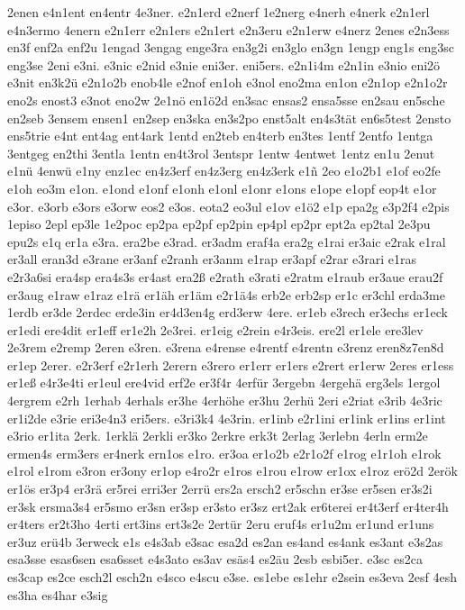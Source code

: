 {2enen
e4n1ent
en4entr
4e3ner.
e2n1erd
e2nerf
1e2nerg
e4nerh
e4nerk
e2n1erl
e4n3ermo
4enern
e2n1err
e2n1ers
e2n1ert
e2n3eru
e2n1erw
e4nerz
2enes
e2n3ess
en3f
enf2a
enf2u
1engad
3engag
enge3ra
en3g2i
en3glo
en3gn
1engp
eng1s
eng3sc
eng3se
2eni
e3ni.
e3nic
e2nid
e3nie
eni3er.
eni5ers.
e2n1i4m
e2n1in
e3nio
eni2ö
e3nit
en3k2ü
e2n1o2b
enob4le
e2nof
en1oh
e3nol
eno2ma
en1on
e2n1op
e2n1o2r
eno2s
enost3
e3not
eno2w
2e1nö
en1ö2d
en3sac
ensas2
ensa5sse
en2sau
en5sche
en2seb
3ensem
ensen1
en2sep
en3ska
en3s2po
enst5alt
en4s3tät
en6s5test
2ensto
ens5trie
e4nt
ent4ag
ent4ark
1entd
en2teb
en4terb
en3tes
1entf
2entfo
1entga
3entgeg
en2thi
3entla
1entn
en4t3rol
3entspr
1entw
4entwet
1entz
en1u
2enut
e1nü
4enwü
e1ny
enz1ec
en4z3erf
en4z3erg
en4z3erk
e1ñ
2eo
e1o2b1
e1of
eo2fe
e1oh
eo3m
e1on.
e1ond
e1onf
e1onh
e1onl
e1onr
e1ons
e1ope
e1opf
eop4t
e1or
e3or.
e3orb
e3ors
e3orw
eos2
e3os.
eota2
eo3ul
e1ov
e1ö2
e1p
epa2g
e3p2f4
e2pis
1episo
2epl
ep3le
1e2poc
ep2pa
ep2pf
ep2pin
ep4pl
ep2pr
ept2a
ep2tal
2e3pu
epu2s
e1q
er1a
e3ra.
era2be
e3rad.
er3adm
eraf4a
era2g
e1rai
er3aic
e2rak
e1ral
er3all
eran3d
e3rane
er3anf
e2ranh
er3anm
e1rap
er3apf
e2rar
e3rari
e1ras
e2r3a6si
era4sp
era4s3s
er4ast
era2ß
e2rath
e3rati
e2ratm
e1raub
er3aue
erau2f
er3aug
e1raw
e1raz
e1rä
er1äh
er1äm
e2r1ä4s
erb2e
erb2sp
er1c
er3chl
erda3me
1erdb
er3de
2erdec
erde3in
er4d3en4g
erd3erw
4ere.
er1eb
e3rech
er3echs
er1eck
er1edi
ere4dit
er1eff
er1e2h
2e3rei.
er1eig
e2rein
e4r3eis.
ere2l
er1ele
ere3lev
2e3rem
e2remp
2eren
e3ren.
e3rena
e4rense
e4rentf
e4rentn
e3renz
eren8z7en8d
er1ep
2erer.
e2r3erf
e2r1erh
2erern
e3rero
er1err
er1ers
e2rert
er1erw
2eres
er1ess
er1eß
e4r3e4ti
er1eul
ere4vid
erf2e
er3f4r
4erfür
3ergebn
4ergehä
erg3els
1ergol
4ergrem
e2rh
1erhab
4erhals
er3he
4erhöhe
er3hu
2erhü
2eri
e2riat
e3rib
4e3ric
er1i2de
e3rie
eri3e4n3
eri5ers.
e3ri3k4
4e3rin.
er1inb
e2r1ini
er1ink
er1ins
er1int
e3rio
er1ita
2erk.
1erklä
2erkli
er3ko
2erkre
erk3t
2erlag
3erlebn
4erln
erm2e
ermen4s
erm3ers
er4nerk
ern1os
e1ro.
er3oa
er1o2b
e2r1o2f
e1rog
e1r1oh
e1rok
e1rol
e1rom
e3ron
er3ony
er1op
e4ro2r
e1ros
e1rou
e1row
er1ox
e1roz
erö2d
2erök
er1ös
er3p4
er3rä
er5rei
erri3er
2errü
ers2a
ersch2
er5schn
er3se
er5sen
er3s2i
er3sk
ersma3s4
er5smo
er3sn
er3sp
er3sto
er3sz
ert2ak
er6terei
er4t3erf
er4ter4h
er4ters
er2t3ho
4erti
ert3ins
ert3s2e
2ertür
2eru
eruf4s
er1u2m
er1und
er1uns
er3uz
erü4b
3erweck
e1s
e4s3ab
e3sac
esa2d
es2an
es4and
es4ank
es3ant
e3s2as
esa3sse
esas6sen
esa6sset
e4s3ato
es3av
esäs4
es2äu
2esb
esbi5er.
e3sc
es2ca
es3cap
es2ce
esch2l
esch2n
e4sco
e4scu
e3se.
es1ebe
es1ehr
e2sein
es3eva
2esf
4esh
es3ha
es4har
e3sig
}
